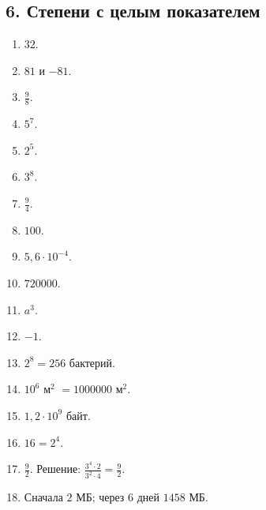 \documentclass[12pt,a4paper]{article}
\theoremstyle{definition}
\theoremstyle{plain}
\theoremstyle{remark}
\newcommand{\starmark}{\ensuremath{{}^{\ast}}}
\begin{document}
\subsection*{6. Степени с целым показателем}
\begin{enumerate}[label=6.\arabic*.,leftmargin=2.8em,itemsep=5pt]
\item \(32\).
\item \(81\) и \(- 81\).
\item \(\frac{9}{8}\).
\item \(5^{7}\).
\item \(2^{5}\).
\item \(3^{8}\).
\item \(\frac{9}{4}\).
\item \(100\).
\item \(5{,}6 \cdot  10^{- 4}\).
\item \(720000\).
\item \(a^{3}\).
\item \(- 1\).
\item \(2^{8} = 256\) бактерий.
\item \(10^{6}\) м\(^{2}\) \(= 1000000\) м\(^{2}\).
\item \(1{,}2 \cdot  10^{9}\) байт.
\item[\textbf{6.16.}\starmark] \(16 = 2^{4}\).
\item[\textbf{6.17.}\starmark] \(\frac{9}{2}\). Решение: \(\frac{3^{4} \cdot 2}{3^{2} \cdot 4} = \frac{9}{2}\).
\item[\textbf{6.18.}\starmark] Сначала \(2\) МБ; через \(6\) дней \(1458\) МБ.
\end{enumerate}
\end{document}
